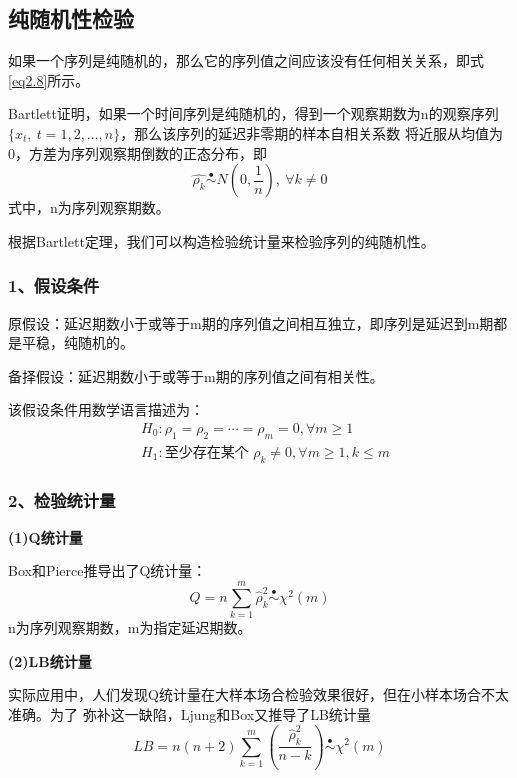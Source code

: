 \documentclass[12pt, a4paper, oneside]{ctexbook}
\begin{document}
\subsection{纯随机性检验}\label{subse2.3.3}
如果一个序列是纯随机的，那么它的序列值之间应该没有任何相关关系，即式\ref{eq2.8}所示。

Bartlett证明，如果一个时间序列是纯随机的，得到一个观察期数为n的观察序列$\{x_t,~t = 1,2,...,n\}$，那么该序列的延迟非零期的样本自相关系数
将近服从均值为0，方差为序列观察期倒数的正态分布，即
\begin{equation}
    \hat{\rho_k} \overset{\bullet}{\operatorname*{\sim}} N(0,\frac{1}{n}),~\forall k \neq 0
\end{equation}
式中，n为序列观察期数。

根据Bartlett定理，我们可以构造检验统计量来检验序列的纯随机性。

\subsubsection{1、假设条件}
原假设：延迟期数小于或等于m期的序列值之间相互独立，即序列是延迟到m期都是平稳，纯随机的。

备择假设：延迟期数小于或等于m期的序列值之间有相关性。

该假设条件用数学语言描述为：
\begin{equation}
    \begin{aligned}
         & H_0:\rho_1=\rho_2=\cdots=\rho_m=0,\forall m\geqslant1          \\
         & H_1:\text{至少存在某个 }\rho_k\neq0,\forall m\geqslant1,k\leqslant m
    \end{aligned}
\end{equation}

\subsubsection{2、检验统计量}

\textbf{(1)Q统计量}

Box和Pierce推导出了Q统计量：
\begin{equation}
    Q=n\sum_{k\operatorname{=}1}^m\hat{\rho}_k^2\overset{\bullet}{\operatorname*{\sim}}\chi^2(m)
\end{equation}
n为序列观察期数，m为指定延迟期数。

\textbf{(2)LB统计量}

实际应用中，人们发现Q统计量在大样本场合检验效果很好，但在小样本场合不太准确。为了
弥补这一缺陷，Ljung和Box又推导了LB统计量
\begin{equation}
    LB=n(n+2)\sum_{k=1}^m\left(\frac{\hat{\rho}_k^2}{n-k}\right)
    \overset{\bullet}{\operatorname*{\sim}} \chi^2(m)
\end{equation}
\end{document}
